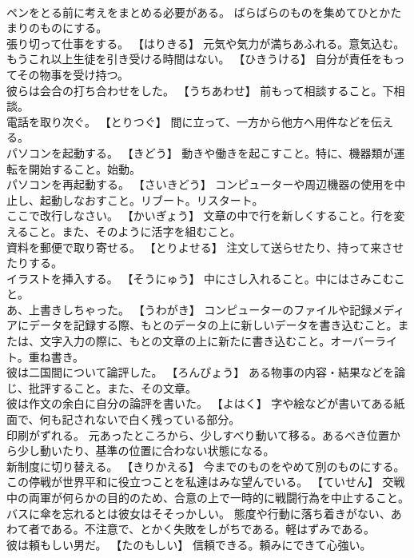 \documentclass[8pt]{extreport}
\begin{document}
\begin{CJK}{UTF8}{min}
\\	ペンをとる前に考えをまとめる必要がある。	ばらばらのものを集めてひとかたまりのものにする。
\\	張り切って仕事をする。	【はりきる】 元気や気力が満ちあふれる。意気込む。
\\	もうこれ以上生徒を引き受ける時間はない。	【ひきうける】 自分が責任をもってその物事を受け持つ。
\\	彼らは会合の打ち合わせをした。	【うちあわせ】 前もって相談すること。下相談。
\\	電話を取り次ぐ。	【とりつぐ】 間に立って、一方から他方へ用件などを伝える。
\\	パソコンを起動する。	【きどう】 動きや働きを起こすこと。特に、機器類が運転を開始すること。始動。
\\	パソコンを再起動する。	【さいきどう】 コンピューターや周辺機器の使用を中止し、起動しなおすこと。リブート。リスタート。
\\	ここで改行しなさい。	【かいぎょう】 文章の中で行を新しくすること。行を変えること。また、そのように活字を組むこと。
\\	資料を郵便で取り寄せる。	【とりよせる】 注文して送らせたり、持って来させたりする。
\\	イラストを挿入する。	【そうにゅう】 中にさし入れること。中にはさみこむこと。
\\	あ、上書きしちゃった。	【うわがき】 コンピューターのファイルや記録メディアにデータを記録する際、もとのデータの上に新しいデータを書き込むこと。または、文字入力の際に、もとの文章の上に新たに書き込むこと。オーバーライト。重ね書き。
\\	彼は二国間について論評した。	【ろんぴょう】 ある物事の内容・結果などを論じ、批評すること。また、その文章。
\\	彼は作文の余白に自分の論評を書いた。	【よはく】 字や絵などが書いてある紙面で、何も記されないで白く残っている部分。
\\	印刷がずれる。	元あったところから、少しすべり動いて移る。あるべき位置から少し動いたり、基準の位置に合わない状態になる。
\\	新制度に切り替える。	【きりかえる】 今までのものをやめて別のものにする。
\\	この停戦が世界平和に役立つことを私達はみな望んでいる。	【ていせん】 交戦中の両軍が何らかの目的のため、合意の上で一時的に戦闘行為を中止すること。
\\	バスに傘を忘れるとは彼女はそそっかしい。	態度や行動に落ち着きがない、あわて者である。不注意で、とかく失敗をしがちである。軽はずみである。
\\	彼は頼もしい男だ。	【たのもしい】 信頼できる。頼みにできて心強い。

\end{CJK}
\end{document}
